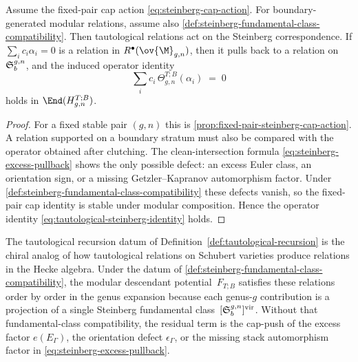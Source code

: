 \begin{proposition}
\label{prop:tautological-steinberg}
Assume the fixed-pair cap action
\eqref{eq:steinberg-cap-action}. For boundary-generated modular
relations, assume also
\autoref{def:steinberg-fundamental-class-compatibility}.
Then tautological relations act on the Steinberg correspondence.
If $\sum_i c_i \alpha_i = 0$ is a relation in
$R^\bullet(\ov{\M}_{g,n})$, then it pulls back to a relation
on~$\mathfrak{S}_b^{g,n}$, and the induced operator identity
\begin{equation}
\label{eq:tautological-steinberg-identity}
\sum_i c_i\,\Theta_{g,n}^{T;B}(\alpha_i) \;=\; 0
\end{equation}
holds in $\End(H_{g,n}^{T;B})$.
\end{proposition}

\begin{proof}
For a fixed stable pair $(g,n)$ this is
\autoref{prop:fixed-pair-steinberg-cap-action}. A relation
supported on a boundary stratum must also be compared with the
operator obtained after clutching. The clean-intersection formula
\eqref{eq:steinberg-excess-pullback} shows the only possible defect:
an excess Euler class, an orientation sign, or a missing
Getzler--Kapranov automorphism factor. Under
\autoref{def:steinberg-fundamental-class-compatibility} these defects
vanish, so the fixed-pair cap identity is stable under modular
composition. Hence the operator identity
\eqref{eq:tautological-steinberg-identity} holds.
\end{proof}

\begin{remark}
\label{rem:steinberg-hecke-analogy}
The tautological recursion datum of Definition~\ref{def:tautological-recursion}
is the chiral analog of how tautological relations on Schubert
varieties produce relations in the Hecke algebra.
Under the datum of
\autoref{def:steinberg-fundamental-class-compatibility}, the
modular descendant potential~$F_{T;B}$ satisfies these relations
order by order in the genus expansion because each genus-$g$
contribution is a projection of a single Steinberg fundamental
class~$[\mathfrak{S}_b^{g,n}]^{\mathrm{vir}}$. Without that
fundamental-class compatibility, the residual term is the cap-push of the excess factor
$e(E_\Gamma)$, the orientation defect $\epsilon_\Gamma$, or the
missing stack automorphism factor in
\eqref{eq:steinberg-excess-pullback}.
\end{remark}

